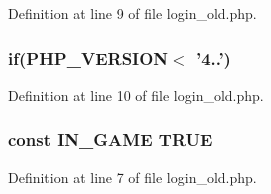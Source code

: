 Definition at line 9 of file login\+\_\+old.\+php.

\hypertarget{login__old_8php_a4ac1118c2e44c513a674bc1793ba6c90}{
\subsubsection[{if}]{\setlength{\rightskip}{0pt plus 5cm}if(P\+H\+P\+\_\+\+V\+E\+R\+S\+I\+O\+N$<$  '4..')}}\label{login__old_8php_a4ac1118c2e44c513a674bc1793ba6c90}


Definition at line 10 of file login\+\_\+old.\+php.

\hypertarget{login__old_8php_a12c82f3d28569a3f80804f1e72cef14c}{
\subsubsection[{I\+N\+\_\+\+G\+A\+M\+E}]{\setlength{\rightskip}{0pt plus 5cm}const I\+N\+\_\+\+G\+A\+M\+E T\+R\+U\+E}}\label{login__old_8php_a12c82f3d28569a3f80804f1e72cef14c}


Definition at line 7 of file login\+\_\+old.\+php.

